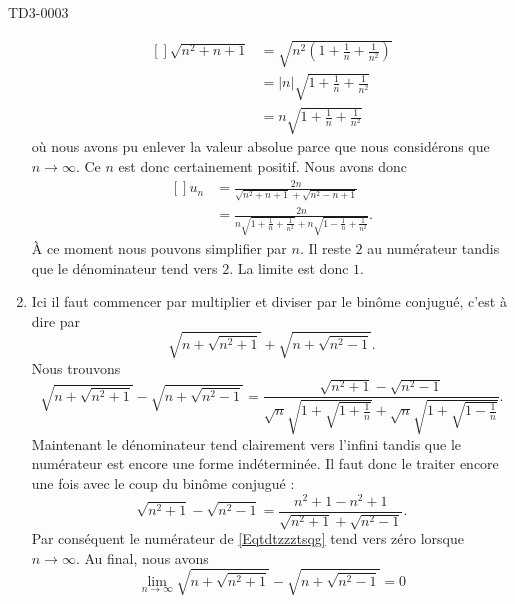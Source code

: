 \begin{corrige}{TD3-0003}
\begin{enumerate}
			\begin{equation}
				\begin{aligned}[]
					\sqrt{n^2+n+1}&=\sqrt{n^2\left( 1+\frac{1}{ n }+\frac{1}{ n^2 } \right)}\\
					&=| n |\sqrt{1+\frac{1}{ n }+\frac{1}{ n^2 }}\\
					&= n \sqrt{1+\frac{1}{ n }+\frac{1}{ n^2 }}
				\end{aligned}
			\end{equation}
			où nous avons pu enlever la valeur absolue parce que nous considérons que $n\to\infty$. Ce $n$ est donc certainement positif. Nous avons donc
			\begin{equation}
				\begin{aligned}[]
					u_n&=\frac{ 2n }{   \sqrt{n^2+n+1}+\sqrt{n^2-n+1}   }\\
					&=\frac{ 2n }{ n \sqrt{1+\frac{1}{ n }+\frac{1}{ n^2 }}+n\sqrt{1-\frac{1}{ n }+\frac{1}{ n^2 }} }.
				\end{aligned}
			\end{equation}
			À ce moment nous pouvons simplifier par $n$. Il reste $2$ au numérateur tandis que le dénominateur tend vers $2$. La limite est donc $1$.
		\item
			Ici il faut commencer par multiplier et diviser par le binôme conjugué, c'est à dire par
			\begin{equation}
				\sqrt{n+\sqrt{n^2+1}}+\sqrt{n+\sqrt{n^2-1}}.
			\end{equation}
			Nous trouvons
            \begin{equation}        \label{Eqtdtzzztsqg}
                \sqrt{n+\sqrt{n^2+1}}-\sqrt{n+\sqrt{n^2-1}}=\frac{  \sqrt{n^2+1}-\sqrt{n^2-1} }{ \sqrt{n}\sqrt{1+\sqrt{ 1+\frac{1}{n} }  }+\sqrt{n}\sqrt{1+\sqrt{ 1-\frac{1}{n} }} }.
			\end{equation}
            Maintenant le dénominateur tend clairement vers l'infini tandis que le numérateur est encore une forme indéterminée. Il faut donc le traiter encore une fois avec le coup du binôme conjugué :
            \begin{equation}
                \sqrt{n^2+1}-\sqrt{n^2-1}=\frac{ n^2+1-n^2+1 }{ \sqrt{n^2+1}+\sqrt{n^2-1} }.
            \end{equation}
            Par conséquent le numérateur de \eqref{Eqtdtzzztsqg} tend vers zéro lorsque \( n\to\infty\). Au final, nous avons
            \begin{equation}
                \lim_{n\to \infty} \sqrt{n+\sqrt{n^2+1}}-\sqrt{n+\sqrt{n^2-1}}=0
            \end{equation}

\end{enumerate}
\end{corrige}
